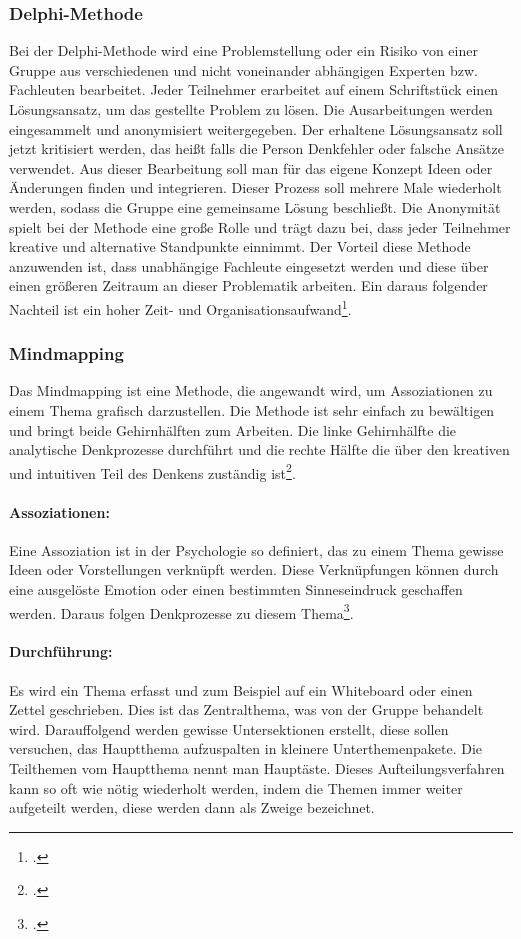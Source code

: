 \subsubsection{Delphi-Methode}
Bei der Delphi-Methode wird eine Problemstellung oder ein Risiko von einer Gruppe aus verschiedenen und nicht voneinander abhängigen Experten bzw. Fachleuten bearbeitet. 
Jeder Teilnehmer erarbeitet auf einem Schriftstück einen Lösungsansatz, um das gestellte Problem zu lösen.
Die Ausarbeitungen werden eingesammelt und anonymisiert weitergegeben.
Der erhaltene Lösungsansatz soll jetzt kritisiert werden, das heißt falls die Person Denkfehler oder falsche Ansätze verwendet. Aus dieser Bearbeitung soll man für das eigene Konzept Ideen oder Änderungen finden und integrieren.
Dieser Prozess soll mehrere Male wiederholt werden, sodass die Gruppe eine gemeinsame Lösung beschließt.
Die Anonymität spielt bei der Methode eine große Rolle und trägt dazu bei, dass jeder Teilnehmer kreative und alternative Standpunkte einnimmt.
Der Vorteil diese Methode anzuwenden ist, dass unabhängige Fachleute eingesetzt werden und diese über einen größeren Zeitraum an dieser Problematik arbeiten.
Ein daraus folgender Nachteil ist ein hoher Zeit- und Organisationsaufwand\footcite{risikomanagement-diplomarbeit-methoden}.

\subsubsection{Mindmapping}
Das Mindmapping ist eine Methode, die angewandt wird, um Assoziationen zu einem Thema grafisch darzustellen.
Die Methode ist sehr einfach zu bewältigen und bringt beide Gehirnhälften zum Arbeiten. Die linke Gehirnhälfte die analytische Denkprozesse durchführt und die rechte Hälfte die über den kreativen und intuitiven Teil des Denkens zuständig ist\footcite{risikomanagement-diplomarbeit-methoden}.

\paragraph{Assoziationen:} 
Eine Assoziation ist in der Psychologie so definiert, das zu einem Thema gewisse Ideen oder Vorstellungen verknüpft werden. Diese Verknüpfungen können durch eine ausgelöste Emotion oder einen bestimmten Sinneseindruck geschaffen werden. Daraus folgen Denkprozesse zu diesem Thema\footcite{assoziationen}. 

\paragraph{Durchführung:}
Es wird ein Thema erfasst und zum Beispiel auf ein Whiteboard oder einen Zettel geschrieben. Dies ist das Zentralthema, was von der Gruppe behandelt wird.
Darauffolgend werden gewisse Untersektionen erstellt, diese sollen versuchen, das Hauptthema aufzuspalten in kleinere Unterthemenpakete.
Die Teilthemen vom Hauptthema nennt man Hauptäste.
Dieses Aufteilungsverfahren kann so oft wie nötig wiederholt werden, indem die Themen immer weiter aufgeteilt werden, diese werden dann als Zweige bezeichnet.

